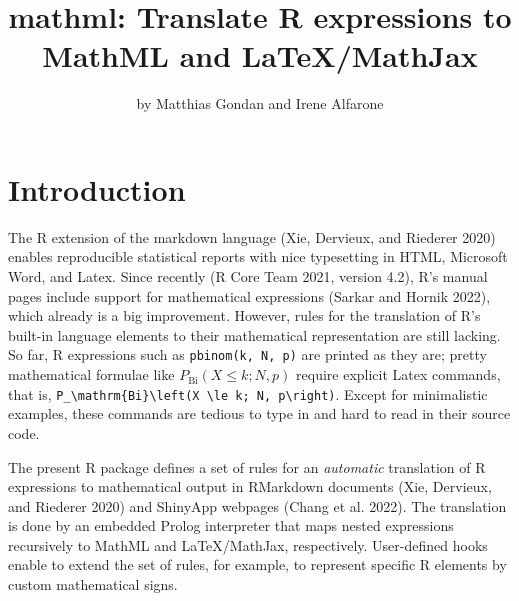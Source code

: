 \title{mathml: Translate R expressions to MathML and LaTeX/MathJax}
\author{by Matthias Gondan and Irene Alfarone}

\maketitle


\hypertarget{introduction}{%
\section{Introduction}\label{introduction}}

The R extension of the markdown language (Xie, Dervieux, and Riederer 2020) enables reproducible
statistical reports with nice typesetting in HTML, Microsoft Word, and Latex.
Since recently (R Core Team 2021, version 4.2), R's manual pages include support for
mathematical expressions (Sarkar and Hornik 2022), which already is a big improvement.
However, rules for the translation of R's built-in language elements to their
mathematical representation are still lacking. So far, R expressions such
as \texttt{pbinom(k,\ N,\ p)} are printed as they are; pretty mathematical formulae
like \(P_\mathrm{Bi}(X \le k; N, p)\) require explicit Latex commands, that
is, \texttt{P\_\textbackslash{}mathrm\{Bi\}\textbackslash{}left(X\ \textbackslash{}le\ k;\ N,\ p\textbackslash{}right)}. Except for minimalistic examples,
these commands are tedious to type in and hard to read in their source code.

The present R package defines a set of rules for an \emph{automatic} translation of
R expressions to mathematical output in RMarkdown documents (Xie, Dervieux, and Riederer 2020) and
ShinyApp webpages (Chang et al. 2022). The translation is done by an embedded Prolog
interpreter that maps nested expressions recursively to MathML and
LaTeX/MathJax, respectively. User-defined hooks enable to extend the set of
rules, for example, to represent specific R elements by custom mathematical
signs.

